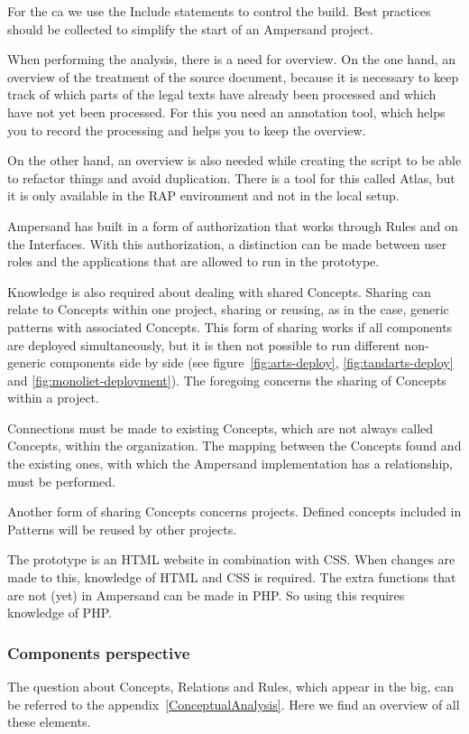 For the \acrlong{ca} we use the Include statements to control the build.
Best practices should be collected to simplify the start of an Ampersand project.

When performing the analysis, there is a need for overview.
On the one hand, an overview of the treatment of the source document, because it is necessary to keep track of which parts of the legal texts have already been processed and which have not yet been processed.
For this you need an annotation tool, which helps you to record the processing and helps you to keep the overview.

On the other hand, an overview is also needed while creating the script to be able to refactor things and avoid duplication.
There is a tool for this called Atlas, but it is only available in the RAP environment and not in the local setup.

Ampersand has built in a form of authorization that works through Rules and on the Interfaces.
With this authorization, a distinction can be made between user roles and the applications that are allowed to run in the prototype.

Knowledge is also required about dealing with shared Concepts.
Sharing can relate to Concepts within one project, sharing or reusing, as in the case, generic patterns with associated Concepts.
This form of sharing works if all components are deployed simultaneously, but it is then not possible to run different non-generic components side by side (see figure~\ref{fig:arts-deploy}, \ref{fig:tandarts-deploy} and \ref{fig:monoliet-deployment}).
The foregoing concerns the sharing of Concepts within a project.

Connections must be made to existing Concepts, which are not always called Concepts, within the organization.
The mapping between the Concepts found and the existing ones, with which the Ampersand implementation has a relationship, must be performed.

Another form of sharing Concepts concerns projects.
Defined concepts included in Patterns will be reused by other projects.

The prototype is an HTML website in combination with CSS.
When changes are made to this, knowledge of HTML and CSS is required.
The extra functions that are not (yet) in Ampersand can be made in PHP.
So using this requires knowledge of PHP.

\subsubsection{Components perspective}\label{subsub:components_perspective}
The question about Concepts, Relations and Rules, which appear in the \acrshort{big}, can be referred to the appendix~\ref{ConceptualAnalysis}.
Here we find an overview of all these elements.

